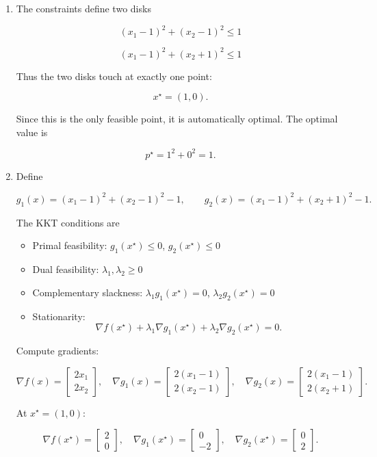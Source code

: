 \documentclass[
	12pt,
]{fphw}
\begin{document}
\begin{enumerate}

\item[(a)]

The constraints define two disks

\[
(x_1-1)^2+(x_2-1)^2 \le 1
\]


\[
(x_1-1)^2+(x_2+1)^2 \le 1
\]

Thus the two disks touch at exactly one point:

\[
x^\star=(1,0).
\]

Since this is the only feasible point, it is automatically optimal. The optimal value is

\[
p^\star = 1^2+0^2 = 1.
\]

\item[(b)]

Define

\[
g_1(x)=(x_1-1)^2+(x_2-1)^2-1,
\qquad
g_2(x)=(x_1-1)^2+(x_2+1)^2-1.
\]

The KKT conditions are

\begin{itemize}
\item Primal feasibility: $g_1(x^\star)\le0$, $g_2(x^\star)\le0$
\item Dual feasibility: $\lambda_1,\lambda_2\ge0$
\item Complementary slackness: $\lambda_1 g_1(x^\star)=0$, $\lambda_2 g_2(x^\star)=0$
\item Stationarity:
\[
\nabla f(x^\star)+\lambda_1\nabla g_1(x^\star)+\lambda_2\nabla g_2(x^\star)=0.
\]
\end{itemize}

Compute gradients:

\[
\nabla f(x)=
\begin{bmatrix}
2x_1\\
2x_2
\end{bmatrix},
\quad
\nabla g_1(x)=
\begin{bmatrix}
2(x_1-1)\\
2(x_2-1)
\end{bmatrix},
\quad
\nabla g_2(x)=
\begin{bmatrix}
2(x_1-1)\\
2(x_2+1)
\end{bmatrix}.
\]

At \(x^\star=(1,0)\):

\[
\nabla f(x^\star)=
\begin{bmatrix}
2\\
0
\end{bmatrix},
\quad
\nabla g_1(x^\star)=
\begin{bmatrix}
0\\
-2
\end{bmatrix},
\quad
\nabla g_2(x^\star)=
\begin{bmatrix}
0\\
2
\end{bmatrix}.
\]


\end{enumerate}
\end{document}

